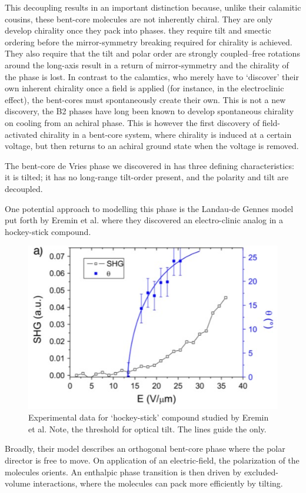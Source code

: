 \documentclass[aagreenthesis]{subfiles}
\begin{document}
This decoupling results in 
an important distinction because, unlike their calamitic cousins, these
bent-core molecules are not inherently chiral. They are only develop chirality
once they pack into phases. they require tilt and smectic ordering
before the mirror-symmetry breaking required for chirality is achieved. They
also require that the tilt and polar order are strongly coupled--free rotations
around the long-axis result in a return of mirror-symmetry and the chirality of
the phase is lost. In contrast to the calamtics, who merely have to `discover'
their own inherent chirality once a field is applied (for instance, in the
electroclinic effect), the bent-cores must spontaneously create their own. This
is not a new discovery, the B2 phases\cite{link_spontaneous_1997} have long been
known to develop spontaneous chirality on cooling from an achiral phase. This
is however
the first discovery of field-activated chirality in a bent-core system, where
chirality is induced at a certain voltage, but then returns to an achiral ground
state when the voltage is removed.

The bent-core de Vries phase we discovered in \nfour{} has three defining
characteristics: it is tilted; it has no long-range tilt-order present, and the
polarity and tilt are decoupled.

One potential approach to modelling this phase is the Landau-de Gennes
model put forth by Eremin et al.\cite{eremin2008electrically} where they
discovered an electro-clinic analog in a hockey-stick compound. 
\begin{figure}
    \centering
    \includegraphics[width=\textwidth]{./figs/pal30/fromPapers/tiltVfield.jpg}
    \caption{\label{fig:achiralTilt} Experimental data for `hockey-stick'
    compound studied by Eremin et al.\cite{eremin2008electrically} Note, the threshold for optical tilt. The lines guide the only.}
\end{figure}
Broadly, their model describes an orthogonal bent-core phase where the polar
director is free to move. On application of an electric-field, the polarization
of the molecules orients. An enthalpic phase transition
is then driven by excluded-volume interactions, where the molecules can pack
more efficiently by tilting. 
\end{document}
